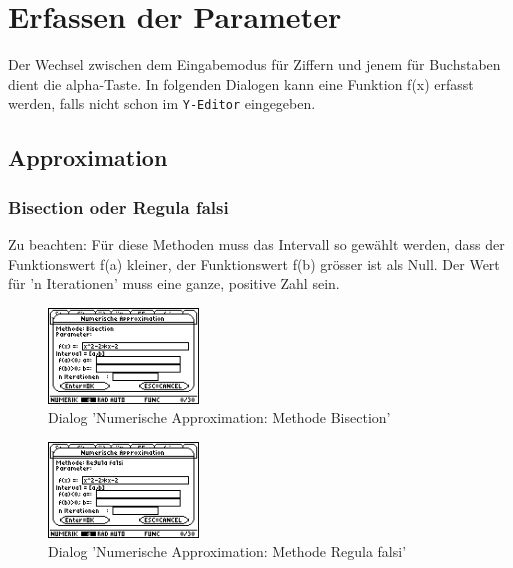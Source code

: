 \documentclass[a5paper,9pt]{scrreprt}
\begin{document}
\newpage
\section{Erfassen der Parameter}
Der Wechsel zwischen dem Eingabemodus f\"ur Ziffern und jenem f\"ur Buchstaben dient die alpha-Taste. In folgenden Dialogen kann eine Funktion f(x) erfasst werden, falls nicht schon im \verb|Y-Editor| eingegeben.

\subsection{Approximation}
\subsubsection*{Bisection oder Regula falsi}
Zu beachten: F\"ur diese Methoden muss das Intervall so gew\"ahlt werden, dass der Funktions­wert f(a) kleiner, der Funktions­wert f(b) gr\"osser ist als Null. Der Wert f\"ur 'n Iterationen' muss eine ganze, positive Zahl sein.
\begin{figure}[h]
  \centering
  \includegraphics[width=4cm]{img/nummeth_image018.png}
  \caption{Dialog 'Numerische Approximation: Methode Bisection'}
  \label{fig:ParameterApproximationBisection}
\end{figure}
\begin{figure}[h]
  \centering
  \includegraphics[width=4cm]{img/nummeth_image020.png}
  \caption{Dialog 'Numerische Approximation: Methode Regula falsi'}
  \label{fig:ParameterApproximationRegulaFalsi}
\end{figure}

\newpage
\end{document}
